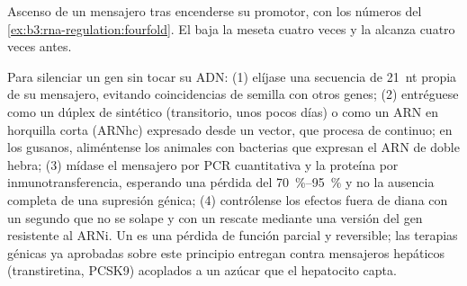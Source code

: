 \begin{omfigure}

{\small Ascenso de un mensajero tras encenderse su promotor, con los
números del \cref{ex:b3:rna-regulation:fourfold}. El  baja la
meseta cuatro veces y la alcanza cuatro veces antes.}
\end{omfigure}

\begin{method}\label{met:b3:rna-regulation:knockdown}
Para silenciar un gen sin tocar su ADN: (1) elíjase una secuencia de
\qty{21}{nt} propia de su mensajero, evitando coincidencias de semilla
con otros genes; (2) entréguese como un dúplex de  sintético
(transitorio, unos pocos días) o como un ARN en horquilla corta (ARNhc)
expresado desde un vector, que  procesa de continuo; en los gusanos,
aliméntense los animales con bacterias que expresan el ARN de doble
hebra; (3) mídase el mensajero por PCR cuantitativa y la proteína por
inmunotransferencia, esperando una pérdida del \qtyrange{70}{95}{\%} y no
la ausencia completa de una supresión génica; (4) contrólense los efectos
fuera de diana con un segundo  que no se solape y con un rescate
mediante una versión del gen resistente al ARNi. Un  es una pérdida de función parcial y reversible; las terapias
génicas ya aprobadas sobre este principio entregan  contra
mensajeros hepáticos (transtiretina, PCSK9) acoplados a un azúcar que el
hepatocito capta.
\end{method}

